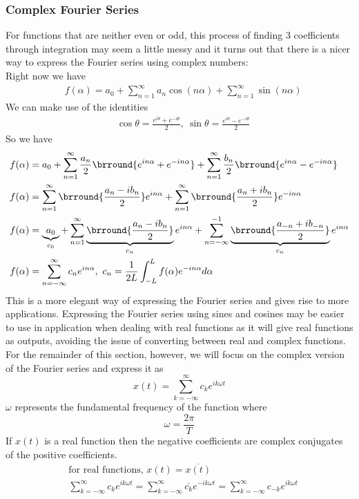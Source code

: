 \subsubsection{Complex Fourier Series}
For functions that are neither even or odd, this process of finding 3 coefficients through integration may seem a little messy and it turns out that there is a nicer way to express the Fourier series using complex numbers:\\
Right now we have
\begin{align*}
    &f(\alpha)=a_0+\sum_{n=1}^\infty a_n\cos(n\alpha)+\sum_{n=1}^\infty\sin(n\alpha)
\end{align*}
We can make use of the identities
\begin{align*}
    &\cos\theta=\frac{e^{i\theta}+e^{-i\theta}}{2},\ \sin\theta=\frac{e^{i\theta}-e^{-i\theta}}{2}
\end{align*}
So we have
\begin{align*}    
    &f(\alpha)=a_0+\sum_{n=1}^\infty\frac{a_n}{2}\brround{e^{in\alpha}+e^{-in\alpha}}+\sum_{n=1}^\infty\frac{b_n}{2}\brround{e^{in\alpha}-e^{-in\alpha}}\\
    &f(\alpha)=\sum_{n=1}^\infty\brround{\frac{a_n-ib_n}{2}}e^{in\alpha}+\sum_{n=1}^\infty\brround{\frac{a_n+ib_n}{2}}e^{-in\alpha}\\
    &f(\alpha)=\underbrace{a_0}_{c_0}+\sum_{n=1}^\infty\underbrace{\brround{\frac{a_n-ib_n}{2}}}_{c_n}e^{in\alpha}+\sum_{n=-\infty}^{-1}\underbrace{\brround{\frac{a_{-n}+ib_{-n}}{2}}}_{c_n}e^{in\alpha}\\
    &f(\alpha)=\sum_{n=-\infty}^\infty c_ne^{in\alpha},\ c_n=\frac{1}{2L}\int_{-L}^Lf(\alpha)e^{-in\alpha}d\alpha
\end{align*}
This is a more elegant way of expressing the Fourier series and gives rise to more applications. Expressing the Fourier series using sines and cosines may be easier to use in application when dealing with real functions as it will give real functions as outputs, avoiding the issue of converting between real and complex functions. For the remainder of this section, however, we will focus on the complex version of the Fourier series and express it as
$$\boxed{x(t)=\sum_{k=-\infty}^\infty c_ke^{ik\omega t}}$$
$\omega$ represents the fundamental frequency of the function where
$$\omega=\frac{2\pi}{T}$$
If $x(t)$ is a real function then the negative coefficients are complex conjugates of the positive coefficients.
\begin{align*}
    &\text{for real functions, }x(t)=\overline{x(t)}\\
    &\sum_{k=-\infty}^\infty c_ke^{ik\omega t}=\sum_{k=-\infty}^\infty \overline{c_k}e^{-ik\omega t}=\sum_{k=-\infty}^\infty c_{-k}e^{ik\omega t}
\end{align*}
